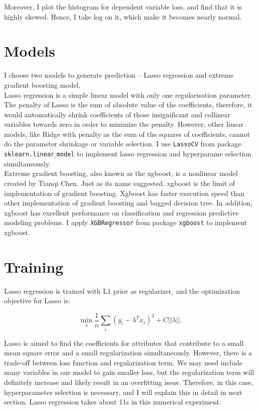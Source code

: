 \documentclass[12pt]{article}
\begin{document}
Moreover, I plot the histogram for dependent variable loss, and find that it is highly skewed. Hence, I take log on it, which make it becomes nearly normal.



\section{Models}

I choose two models to generate prediction -- Lasso regression and extreme gradient boosting model.\\  

Lasso regression is a simple linear model with only one regularisation parameter.  The penalty of Lasso is the sum of absolute value of the coefficients, therefore, it would automatically shrink coefficients of those insignificant and collinear variables towards zero in order to minimize the penalty. However, other linear models, like Ridge with penalty as the sum of the squares of coefficients,  cannot do the parameter shrinkage or variable selection. I use \texttt{LassoCV} from package \texttt{sklearn.linear$\_$model} to implement lasso regression and hyperparame selection simultaneously.\\

Extreme gradient boosting, also known as the xgboost, is a nonlinear model created by Tianqi Chen.  Just as its name suggested, xgboost is the limit of implementation of gradient boosting. Xgboost  has faster execution speed than other implementation of gradient boosting and bagged decision tree. In addition, xgboost has excellent performance  on classification and regression predictive modeling problems. I apply \texttt{XGBRegressor}  from package \texttt{xgboost} to implement xgboost.

\section{Training}

Lasso regression is trained with L1 prior as regularizer, and the optimization objective for Lasso is:

$$\min_{\lambda} \dfrac{1}{n}\sum_{i} (y_i-\lambda^Tx_i)^2+C||\lambda||.$$

Lasso is aimed to find the coefficients for attributes that contribute to a small mean square error and a small regularization simultaneously. However, there is a  trade-off between loss function and regularization term. We may need include many variables in our model to gain smaller loss, but the regularization term will definitely  increase and likely result in an overfitting issue. Therefore, in this case, hyperparameter selection is necessary, and I will explain this in detail in next section. Lasso regression takes about 11s in this numerical experiment.\\
\end{document}
